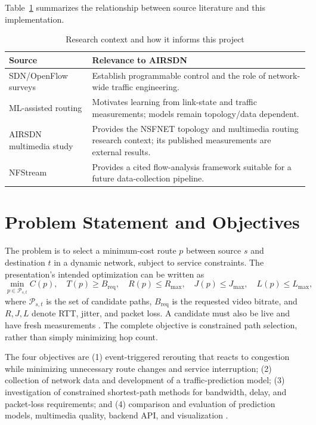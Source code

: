 \documentclass[conference]{IEEEtran}
\begin{document}
Table~\ref{tab:related} summarizes the relationship between source literature and this implementation.
\begin{table}[t]
\centering
\caption{Research context and how it informs this project}
\label{tab:related}
\begin{tabular}{@{}p{}p{}@{}}
\toprule
Source & Relevance to AIRSDN \\
\midrule
SDN/OpenFlow surveys & Establish programmable control and the role of network-wide traffic engineering. \\
ML-assisted routing & Motivates learning from link-state and traffic measurements; models remain topology/data dependent. \\
AIRSDN multimedia study & Provides the NSFNET topology and multimedia routing research context; its published measurements are external results. \\
NFStream & Provides a cited flow-analysis framework suitable for a future data-collection pipeline. \\
\bottomrule
\end{tabular}
\end{table}

\section{Problem Statement and Objectives}
The problem is to select a minimum-cost route $p$ between source $s$ and destination $t$ in a dynamic network, subject to service constraints. The presentation's intended optimization can be written as
\begin{equation}
 \min_{p\in\mathcal{P}_{s,t}} C(p),\quad
 T(p)\geq B_{\mathrm{req}},\quad R(p)\leq R_{\max},\quad
 J(p)\leq J_{\max},\quad L(p)\leq L_{\max},
\end{equation}
where $\mathcal{P}_{s,t}$ is the set of candidate paths, $B_{\mathrm{req}}$ is the requested video bitrate, and $R,J,L$ denote RTT, jitter, and packet loss. A candidate must also be live and have fresh measurements \cite{airsdn_presentation}. The complete objective is constrained path selection, rather than simply minimizing hop count.

The four objectives are (1) event-triggered rerouting that reacts to congestion while minimizing unnecessary route changes and service interruption; (2) collection of network data and development of a traffic-prediction model; (3) investigation of constrained shortest-path methods for bandwidth, delay, and packet-loss requirements; and (4) comparison and evaluation of prediction models, multimedia quality, backend API, and visualization \cite{airsdn_presentation}.
\end{document}
